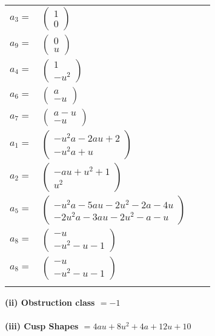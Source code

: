 \documentclass[1p]{elsarticle_modified}
\theoremstyle{definition}
\begin{document}
\begin{tabular}{m{7pt} m{180pt} m{7pt} m{180pt} }
\flushright $a_{3}=$&$\begin{pmatrix}1\\0\end{pmatrix}$ \\
\flushright $a_{9}=$&$\begin{pmatrix}0\\u\end{pmatrix}$ \\
\flushright $a_{4}=$&$\begin{pmatrix}1\\- u^2\end{pmatrix}$ \\
\flushright $a_{6}=$&$\begin{pmatrix}a\\- u\end{pmatrix}$ \\
\flushright $a_{7}=$&$\begin{pmatrix}a- u\\- u\end{pmatrix}$ \\
\flushright $a_{1}=$&$\begin{pmatrix}- u^2 a-2 a u+2\\- u^2 a+u\end{pmatrix}$ \\
\flushright $a_{2}=$&$\begin{pmatrix}- a u+u^2+1\\u^2\end{pmatrix}$ \\
\flushright $a_{5}=$&$\begin{pmatrix}- u^2 a-5 a u-2 u^2-2 a-4 u\\-2 u^2 a-3 a u-2 u^2- a- u\end{pmatrix}$ \\
\flushright $a_{8}=$&$\begin{pmatrix}- u\\- u^2- u-1\end{pmatrix}$\\ \flushright $a_{8}=$&$\begin{pmatrix}- u\\- u^2- u-1\end{pmatrix}$\\&\end{tabular}
\flushleft \textbf{(ii) Obstruction class $= -1$}\\~\\
\flushleft \textbf{(iii) Cusp Shapes $= 4 a u+8 u^2+4 a+12 u+10$}\\~\\
\end{document}
